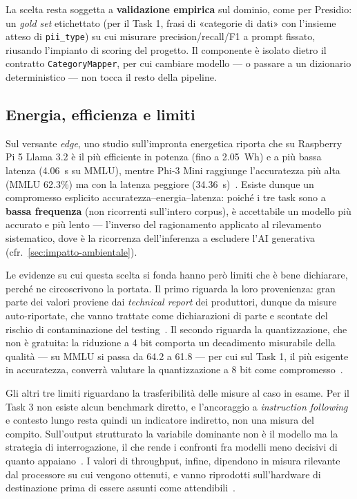La scelta resta soggetta a \textbf{validazione empirica} sul dominio, come per Presidio: un \textit{gold set} etichettato (per il Task 1, frasi di «categorie di dati» con l'insieme atteso di \texttt{pii\_type}) su cui misurare precision/recall/F1 a prompt fissato, riusando l'impianto di scoring del progetto. Il componente è isolato dietro il contratto \texttt{CategoryMapper}, per cui cambiare modello --- o passare a un dizionario deterministico --- non tocca il resto della pipeline.

\subsection{Energia, efficienza e limiti}
\label{sub:slm-energia-limiti}

Sul versante \textit{edge}, uno studio sull'impronta energetica riporta che su Raspberry Pi 5 Llama 3.2 è il più efficiente in potenza (fino a 2.05~Wh) e a più bassa latenza (4.06~s su MMLU), mentre Phi-3 Mini raggiunge l'accuratezza più alta (MMLU 62.3\%) ma con la latenza peggiore (34.36~s)~\cite{edgeenergy2025slm}. Esiste dunque un compromesso esplicito accuratezza--energia--latenza: poiché i tre task sono a \textbf{bassa frequenza} (non ricorrenti sull'intero corpus), è accettabile un modello più accurato e più lento --- l'inverso del ragionamento applicato al rilevamento sistematico, dove è la ricorrenza dell'inferenza a escludere l'AI generativa (cfr.~\ref{sec:impatto-ambientale}).

Le evidenze su cui questa scelta si fonda hanno però limiti che è bene dichiarare, perché ne circoscrivono la portata. Il primo riguarda la loro provenienza: gran parte dei valori proviene dai \textit{technical report} dei produttori, dunque da misure auto-riportate, che vanno trattate come dichiarazioni di parte e scontate del rischio di contaminazione del testing~\cite{abdin2024phi3}. Il secondo riguarda la quantizzazione, che non è gratuita: la riduzione a 4 bit comporta un decadimento misurabile della qualità --- su MMLU si passa da 64.2 a 61.8 --- per cui sul Task 1, il più esigente in accuratezza, converrà valutare la quantizzazione a 8 bit come compromesso~\cite{mobilequant2025}. \medskip

Gli altri tre limiti riguardano la trasferibilità delle misure al caso in esame. Per il Task 3 non esiste alcun benchmark diretto, e l'ancoraggio a \textit{instruction following} e contesto lungo resta quindi un indicatore indiretto, non una misura del compito. Sull'output strutturato la variabile dominante non è il modello ma la strategia di interrogazione, il che rende i confronti fra modelli meno decisivi di quanto appaiano~\cite{tenckhoff2026llmstructbench}. I valori di throughput, infine, dipendono in misura rilevante dal processore su cui vengono ottenuti, e vanno riprodotti sull'hardware di destinazione prima di essere assunti come attendibili~\cite{ondevice2025systematic}.
